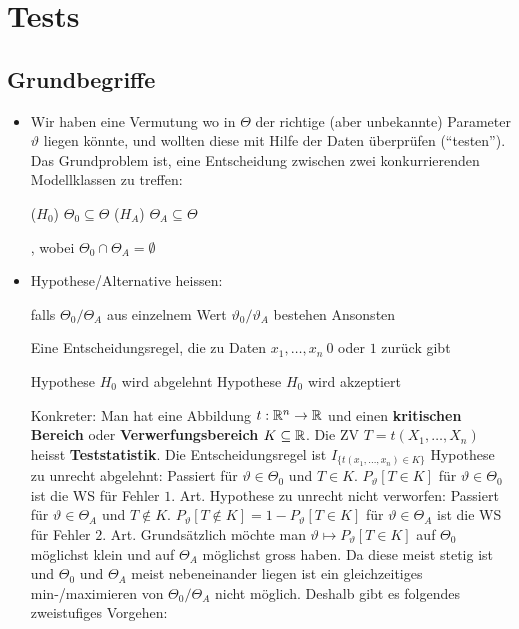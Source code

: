 
\section{Tests}
\subsection{Grundbegriffe}
\begin{itemize}
    \item Wir haben eine Vermutung wo in $\Theta$ der richtige (aber unbekannte) Parameter $\vartheta$ liegen könnte, und wollten diese mit Hilfe der Daten überprüfen (``testen''). Das Grundproblem ist, eine Entscheidung zwischen zwei konkurrierenden Modellklassen zu treffen:
        \begin{itemize*}
             ($H_0$) $\Theta_0 \subseteq \Theta$
             ($H_A$) $\Theta_A \subseteq \Theta$
        \end{itemize*}, wobei $\Theta_0 \cap \Theta_A = \emptyset$
    \item Hypothese/Alternative heissen:
        \begin{itemize}
             falls $\Theta_0/\Theta_A$ aus einzelnem Wert $\vartheta_0/\vartheta_A$ bestehen
             Ansonsten
        \end{itemize}
     Eine Entscheidungsregel, die zu Daten $x_1, \dots, x_n \ 0$ oder $1$ zurück gibt
        \begin{itemize}
             Hypothese $H_0$ wird abgelehnt
             Hypothese $H_0$ wird akzeptiert
        \end{itemize}
        Konkreter: Man hat eine Abbildung $t: \mathbb{R}^n \to \mathbb{R}$ und einen \textbf{kritischen Bereich} oder \textbf{Verwerfungsbereich} $K \subseteq \mathbb{R}$. Die ZV $T = t(X_1, \dots, X_n)$ heisst \textbf{Teststatistik}. Die Entscheidungsregel ist $I_{\{t(x_1, \dots, x_n) \in K\}}$
         Hypothese zu unrecht abgelehnt: Passiert für $\vartheta \in \Theta_0$ und $T \in K$. $P_\vartheta[T \in K]$ für $\vartheta \in \Theta_0$ ist die WS für Fehler $1.$ Art.
         Hypothese zu unrecht nicht verworfen: Passiert für $\vartheta \in \Theta_A$ und $T \notin K$. $P_\vartheta[T \notin K] = 1 - P_\vartheta[T \in K]$ für $\vartheta \in \Theta_A$ ist die WS für Fehler $2.$ Art.
     Grundsätzlich möchte man $\vartheta \mapsto P_\vartheta[T \in K]$ auf $\Theta_0$ möglichst klein und auf $\Theta_A$ möglichst gross haben. Da diese meist stetig ist und $\Theta_0$ und $\Theta_A$ meist nebeneinander liegen ist ein gleichzeitiges min-/maximieren von $\Theta_0/\Theta_A$ nicht möglich. Deshalb gibt es folgendes zweistufiges Vorgehen:

\end{itemize}
